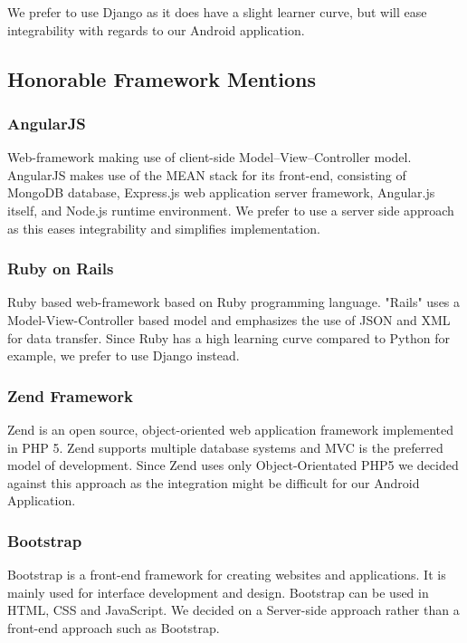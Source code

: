 \documentclass{article}
\begin{document}
	We prefer to use Django as it does have a slight learner curve, but will ease integrability with regards to our Android application.
	
	
	\subsection{Honorable Framework Mentions}
	\subsubsection{AngularJS}\label{subsubsec: AngularJS}
		Web-framework making use of client-side Model–View–Controller model. 
		AngularJS makes use of the MEAN stack for its front-end, consisting of MongoDB database, Express.js web application server framework, Angular.js itself, and Node.js runtime environment.
		We prefer to use a server side approach as this eases integrability and simplifies implementation.
	\subsubsection{Ruby on Rails}\label{subsubsec: Rails}
		Ruby based web-framework based on Ruby programming language. "Rails" uses a Model-View-Controller based model and emphasizes the use of JSON and XML for data transfer.
		Since Ruby has a high learning curve compared to Python for example, we prefer to use Django instead.
	\subsubsection{Zend Framework}
	 Zend is an open source, object-oriented web application framework implemented in PHP 5. Zend supports multiple database systems and MVC is the preferred model of development.
	 Since Zend uses only Object-Orientated PHP5 we decided against this approach as the integration might be difficult for our Android Application.
	 \subsubsection{Bootstrap}
	 Bootstrap is a front-end framework for creating websites and applications. It is mainly used for interface development and design. Bootstrap can be used in HTML, CSS and JavaScript. 
	 We decided on a Server-side approach rather than a front-end approach such as Bootstrap.
	
\end{document}

